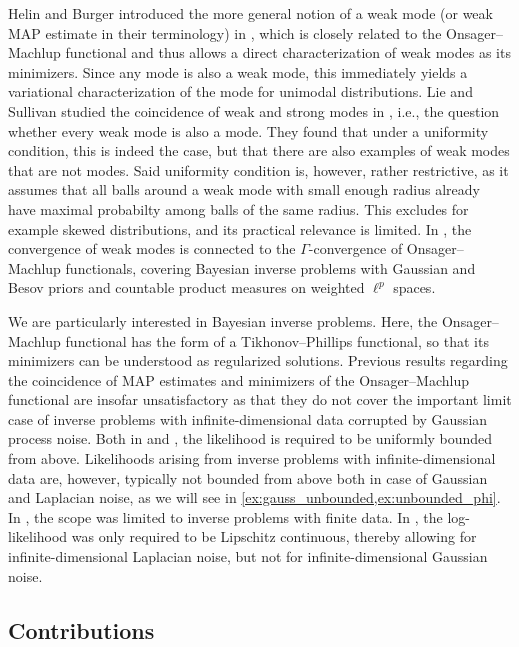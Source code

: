 \documentclass[english]{jnsao}
\theoremstyle{definition}
\begin{document}
Helin and Burger introduced the more general notion of a weak mode (or weak MAP estimate in their terminology) in \cite{helin2015}, which is closely related to the Onsager--Machlup functional and thus allows a direct characterization of weak modes as its minimizers. Since any mode is also a weak mode, this immediately yields a variational characterization of the mode for unimodal distributions. Lie and Sullivan studied the coincidence of weak and strong modes in \cite{Lie_Sul_2018}, i.e., the question whether every weak mode is also a mode. They found that under a uniformity condition, this is indeed the case, but that there are also examples of weak modes that are not modes. Said uniformity condition is, however, rather restrictive, as it assumes that all balls around a weak mode with small enough radius already have maximal probabilty among balls of the same radius. This excludes for example skewed distributions, and its practical relevance is limited. In \cite{Ayanbayev_2022a,Ayanbayev_2022b}, the convergence of weak modes is connected to the $\Gamma$-convergence of Onsager--Machlup functionals, covering Bayesian inverse problems with Gaussian and Besov priors and countable product measures on weighted $\ell^p$ spaces.

We are particularly interested in Bayesian inverse problems. Here, the Onsager--Machlup functional has the form of a Tikhonov--Phillips functional, so that its minimizers can be understood as regularized solutions. Previous results regarding the coincidence of MAP estimates and minimizers of the Onsager--Machlup functional are insofar unsatisfactory as that they do not cover the important limit case of inverse problems with infinite-dimensional data corrupted by Gaussian process noise.
Both in \cite{Dashti:2013} and \cite{klebanov2022}, the likelihood is required to be uniformly bounded from above. Likelihoods arising from inverse problems with infinite-dimensional data are, however, typically not bounded from above both in case of Gaussian and Laplacian noise, as we will see in \cref{ex:gauss_unbounded,ex:unbounded_phi}. In \cite{agapiou2018}, the scope was limited to inverse problems with finite data. In \cite{Kretschmann:2019}, the log-likelihood was only required to be Lipschitz continuous, thereby allowing for infinite-dimensional Laplacian noise, but not for infinite-dimensional Gaussian noise.

\subsection{Contributions}
\end{document}
